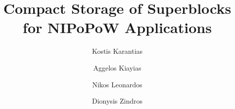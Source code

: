 \title{Compact Storage of Superblocks\\for NIPoPoW Applications}

\ifanonymous
   \author{}
   \institute{}
\else
   \author{
           Kostis Karantias  \and
           Aggelos Kiayias  \and
           Nikos Leonardos  \and
           Dionysis Zindros 
   }
\fi
\maketitle
